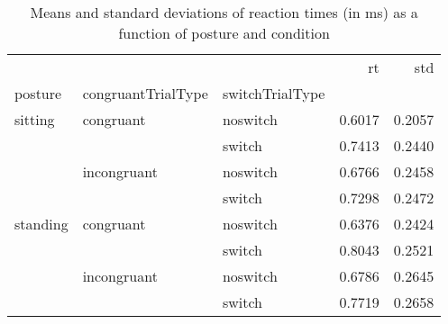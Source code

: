 \begin{table}
\centering
\caption{Means and standard deviations of reaction times (in ms) as a function of posture and condition}
\label{table-task-switching-replication-reaction-time}
\begin{tabular}{lllrr}
\toprule
         &             &        &     rt &    std \\
posture & congruantTrialType & switchTrialType &        &        \\
\midrule
sitting & congruant & noswitch & 0.6017 & 0.2057 \\
         &             & switch & 0.7413 & 0.2440 \\
         & incongruant & noswitch & 0.6766 & 0.2458 \\
         &             & switch & 0.7298 & 0.2472 \\
standing & congruant & noswitch & 0.6376 & 0.2424 \\
         &             & switch & 0.8043 & 0.2521 \\
         & incongruant & noswitch & 0.6786 & 0.2645 \\
         &             & switch & 0.7719 & 0.2658 \\
\bottomrule
\end{tabular}
\end{table}
